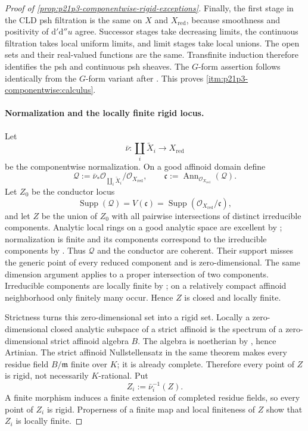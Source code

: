 \begin{proof}[Proof of
\cref{prop:p21p3-componentwise-rigid-exceptions}]
Finally, the first stage in the CLD psh filtration is the same on $X$ and
$X_{\mathrm{red}}$, because smoothness and positivity of
$\mathrm d'\mathrm d''u$ agree.  Successor stages take decreasing limits,
the continuous filtration takes local uniform limits, and limit stages take
local unions.  The open sets and their real-valued functions are the same.
Transfinite induction therefore identifies the psh and continuous psh
sheaves.  The $G$-form assertion follows identically from the $G$-form
variant after \cite[Proposition~15.1.3]{CLD25}.  This proves
\cref{itm:p21p3-componentwise:calculus}.

\paragraph{Normalization and the locally finite rigid locus.}
Let
\[
 \bar\nu:\coprod_i\widetilde X_i\longrightarrow X_{\mathrm{red}}
\]
be the componentwise normalization.  On a good affinoid domain define
\[
 \mathcal Q:=\bar\nu_*\mathcal O_{\coprod_i\widetilde X_i}
                  /\mathcal O_{X_{\mathrm{red}}},
 \qquad
 \mathfrak c:=\operatorname{Ann}_{\mathcal O_{X_{\mathrm{red}}}}
                  (\mathcal Q).
\]
Let $Z_0$ be the conductor locus
\[
 \operatorname{Supp}(\mathcal Q)
   =V(\mathfrak c)
   =\operatorname{Supp}(\mathcal O_{X_{\mathrm{red}}}/\mathfrak c),
\]
and let $Z$ be the union of $Z_0$ with all pairwise intersections of
distinct irreducible components.  Analytic local rings on a good analytic
space are excellent by \cite[\S11.1.10]{CLD25}; normalization is finite and
its components correspond to the irreducible components by
\cite[\S11.3.1]{CLD25}.  Thus $\mathcal Q$ and the conductor are coherent.
Their support misses the generic point of every reduced component and is
zero-dimensional.  The same dimension argument applies to a proper
intersection of two components.  Irreducible components are locally finite
by \cite[\S11.2.5]{CLD25}; on a relatively compact affinoid neighborhood
only finitely many occur.  Hence $Z$ is closed and locally finite.

Strictness turns this zero-dimensional set into a rigid set.  Locally a
zero-dimensional closed analytic subspace of a strict affinoid is the
spectrum of a zero-dimensional strict affinoid algebra $B$.  The algebra is
noetherian by \cite[Theorem~4.5]{Tate71Rigid}, hence Artinian.  The strict
affinoid Nullstellensatz in the same theorem makes every residue field
$B/\mathfrak m$ finite over $K$; it is already complete.  Therefore every
point of $Z$ is rigid, not necessarily $K$-rational.  Put
\begin{equation}
 \label{eq:p21p3-componentwise-conductor-preimage}
                         Z_i:=\bar\nu_i^{-1}(Z).
\end{equation}
A finite morphism induces a finite extension of completed residue fields,
so every point of $Z_i$ is rigid.  Properness of a finite map and local
finiteness of $Z$ show that $Z_i$ is locally finite.


\end{proof}
